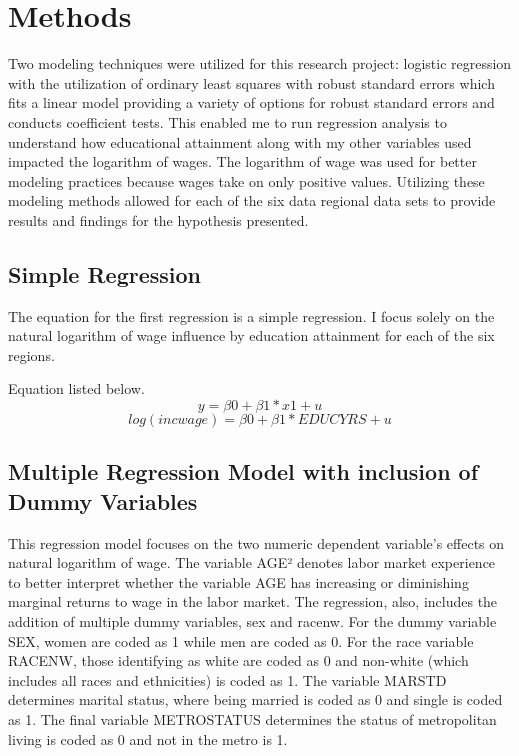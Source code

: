 \documentclass[12pt, English]{article}
\begin{document}
\section{Methods}
Two modeling techniques were utilized for this research project: logistic regression with the utilization of ordinary least squares with robust standard errors which fits a linear model providing a variety of options for robust standard errors and conducts coefficient tests. This enabled me to run regression analysis to understand how educational attainment along with my other variables used impacted the logarithm of wages. The logarithm of wage was used for better modeling practices because wages take on only positive values. Utilizing these modeling methods allowed for each of the six data regional data sets to provide results and findings for the hypothesis presented.  

\subsection{Simple Regression}
The equation for the first regression is a simple regression. I focus solely on the natural logarithm of wage influence by education attainment for each of the six regions. 

Equation listed below.
\begin{equation}
y = \beta0 + \beta1*x1 + u
\end{equation}
\begin{equation}
    log(incwage) = \beta0 + \beta1*EDUCYRS + u 
\end{equation}
\subsection{Multiple Regression Model with inclusion of Dummy Variables}
This regression model focuses on the two numeric dependent variable’s effects on natural logarithm of wage. The variable AGE² denotes labor market experience to better interpret whether the variable AGE has increasing or diminishing marginal returns to wage in the labor market. The regression, also, includes the addition of multiple dummy variables, sex and racenw. For the dummy variable SEX, women are coded as 1 while men are coded as 0. For the race variable RACENW, those identifying as white are coded as 0 and non-white (which includes all races and ethnicities) is coded as 1. The variable MARSTD determines marital status, where being married is coded as 0 and single is coded as 1. The final variable METROSTATUS determines the status of metropolitan living is coded as 0 and not in the metro is 1.  
\end{document}
